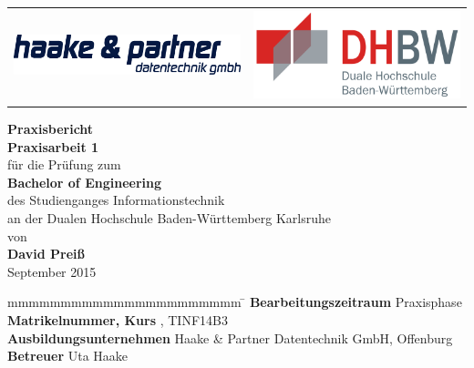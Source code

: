 \begin{titlepage}
	\begin{longtable}{p{} p{}}
		{\includegraphics[height=1.2cm]{bilder/logo}} &
		{\includegraphics[height=2.6cm]{bilder/dhbw}}
	\end{longtable}
	\enlargethispage{20mm}
	\begin{center}
		\vspace*{12mm}	{\LARGE\bf Praxisbericht }\\
		\vspace*{12mm}	{\large\bf Praxisarbeit 1}\\
		\vspace*{12mm}	für die Prüfung zum\\
		\vspace*{3mm}		{\bf Bachelor of Engineering}\\
    \vspace*{12mm}	des Studienganges Informationstechnik{} \\
    \vspace*{3mm}		an der Dualen Hochschule Baden-Württemberg Karlsruhe{} \\
		\vspace*{12mm}	von\\
		\vspace*{3mm}		{\large\bf David Preiß}\\
		\vspace*{12mm}	September 2015\\
	\end{center}
	\vfill
	\begin{spacing}{1.2}
	\begin{tabbing}
		mmmmmmmmmmmmmmmmmmmmmm            \= \kill
		\textbf{Bearbeitungszeitraum}       \>  Praxisphase\\
		\textbf{Matrikelnummer, Kurs}  , TINF14B3\\
		\textbf{Ausbildungsunternehmen}                  \>  Haake \& Partner Datentechnik GmbH, Offenburg\\
		\textbf{Betreuer}               \>  Uta Haake
	\end{tabbing}
	\end{spacing}
\end{titlepage}
